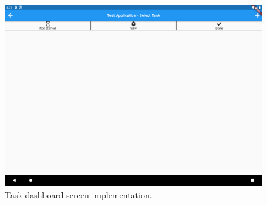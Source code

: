 \begin{figure}[H]
    \centering
    \begin{minipage}{0.45\textwidth}
        \centering
        \includegraphics[width=\textwidth]{Sprint_1/images/task_dashboard_screen_app.png}
        \caption{Task dashboard screen implementation.}
        \label{task_dashboard_screen_app}
    \end{minipage}\hfill
    \begin{minipage}{0.45\textwidth}
    \end{minipage}
\end{figure}
